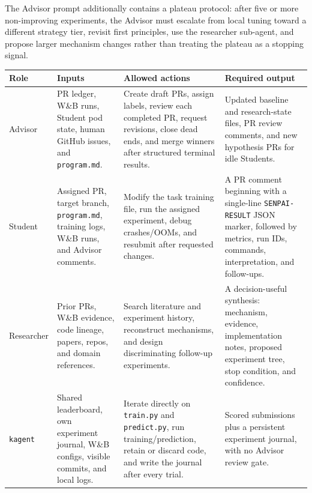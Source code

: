 \documentclass{article}
\begin{document}
The Advisor prompt additionally contains a plateau protocol: after five or more non-improving experiments, the Advisor must escalate from local tuning toward a different strategy tier, revisit first principles, use the researcher sub-agent, and propose larger mechanism changes rather than treating the plateau as a stopping signal.

\begin{center}
  \label{tab:role-contracts}
  \small
  \begin{tabular}{@{}p{}p{}p{}p{}@{}}
    \toprule
    Role & Inputs & Allowed actions & Required output \\
    \midrule
    Advisor & PR ledger, W\&B runs, Student pod state, human GitHub issues, and \texttt{program.md}. & Create draft PRs, assign labels, review each completed PR, request revisions, close dead ends, and merge winners after structured terminal results. & Updated baseline and research-state files, PR review comments, and new hypothesis PRs for idle Students. \\
    Student & Assigned PR, target branch, \texttt{program.md}, training logs, W\&B runs, and Advisor comments. & Modify the task training file, run the assigned experiment, debug crashes/OOMs, and resubmit after requested changes. & A PR comment beginning with a single-line \texttt{SENPAI-RESULT} JSON marker, followed by metrics, run IDs, commands, interpretation, and follow-ups. \\
    Researcher & Prior PRs, W\&B evidence, code lineage, papers, repos, and domain references. & Search literature and experiment history, reconstruct mechanisms, and design discriminating follow-up experiments. & A decision-useful synthesis: mechanism, evidence, implementation notes, proposed experiment tree, stop condition, and confidence. \\
    \texttt{kagent} & Shared leaderboard, own experiment journal, W\&B configs, visible commits, and local logs. & Iterate directly on \texttt{train.py} and \texttt{predict.py}, run training/prediction, retain or discard code, and write the journal after every trial. & Scored submissions plus a persistent experiment journal, with no Advisor review gate. \\
    \bottomrule
  \end{tabular}
\end{center}

\FloatBarrier
\end{document}
